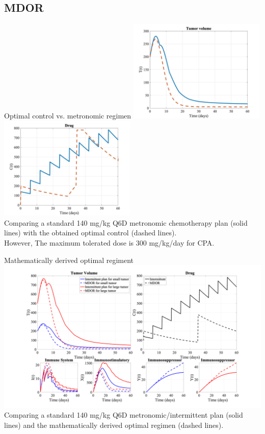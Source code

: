 \documentclass[10pt]{beamer}
\begin{document}
\subsection{MDOR}
\begin{frame}{Optimal control vs. metronomic regimen}
	\includegraphics[width=0.49\textwidth]{chemo-comparison-oc1.jpeg}
	\includegraphics[width=0.49\textwidth]{chemo-comparison-oc2.jpeg} \\
	Comparing a standard 140 mg/kg Q6D metronomic chemotherapy plan (solid lines) with the obtained optimal control (dashed lines). \\ \vspace{0.5cm}
	However, The maximum tolerated dose is 300 mg/kg/day for CPA.
\end{frame}

\begin{frame}{Mathematically derived optimal regiment}
	\includegraphics[width=1\textwidth]{chemo-final.png} \\
	Comparing a standard 140 mg/kg Q6D metronomic/intermittent plan (solid lines) and the mathematically derived optimal regimen (dashed lines). 
\end{frame}
\end{document}
